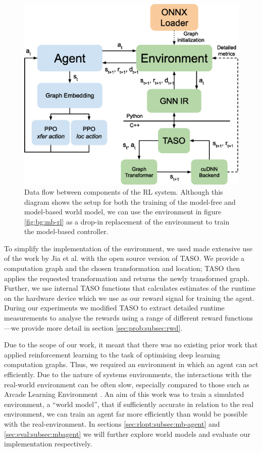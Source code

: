 \begin{figure}[ht]
  \centering
  \includegraphics[width=0.75\columnwidth]{sections/3problem/images/sysenv}
  \caption[RL system environment]{Data flow between components of the RL system. Although this diagram shows the setup for both the training of the model-free and model-based world model, we can use the environment in figure \ref{fig:bg:mb-rl} as a drop-in replacement of the environment to train the model-based controller.}
  \label{fig:problem:sys-env}
\end{figure}

To simplify the implementation of the environment, we used made extensive use of the work by Jia et al. \cite{jia2019taso} with the open source version of TASO. We provide a computation graph and the chosen transformation and location; TASO then applies the requested transformation and returns the newly transformed graph. Further, we use internal TASO functions that calculates estimates of the runtime on the hardware device which we use as our reward signal for training the agent. During our experiments we modified TASO to extract detailed runtime measurements to analyse the rewards using a range of different reward functions---we provide more detail in section \ref{sec:prob:subsec:rwd}.

Due to the scope of our work, it meant that there was no existing prior work that applied reinforcement learning to the task of optimising deep learning computation graphs. Thus, we required an environment in which an agent can act efficiently. Due to the nature of systems environments, the interactions with the real-world environment can be often slow, especially compared to those such as Arcade Learning Environment \cite{Bellemare_2013}. An aim of this work was to train a simulated environment, a ``world model'', that if sufficiently accurate in relation to the real environment, we can train an agent far more efficiently than would be possible with the real-environment. In sections \ref{sec:rlopt:subsec:mb-agent} and \ref{sec:eval:subsec:mbagent} we will further explore world models and evaluate our implementation respectively.

